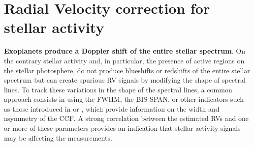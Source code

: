 \documentclass{aa}
\begin{document}
\section{Radial Velocity correction for stellar activity} \label{sec:31}

\textbf{Exoplanets produce a Doppler shift of the entire stellar spectrum}. On the contrary stellar activity and, in particular, the presence of active regions on the stellar photosphere, do not produce blueshifts or redshifts of the entire stellar spectrum but can create spurious RV signals by modifying the shape of spectral lines.
To track these variations in the shape of the spectral lines, a common approach consists in using the FWHM, the BIS SPAN, or other indicators such as those introduced in \citet{Boisse-2011} or \citet{Figueira-2013}, which provide information on the width and asymmetry of the CCF. A strong correlation between the estimated RVs and one or more of these parameters provides an indication that stellar activity signals may be affecting the measurements.
\end{document}
